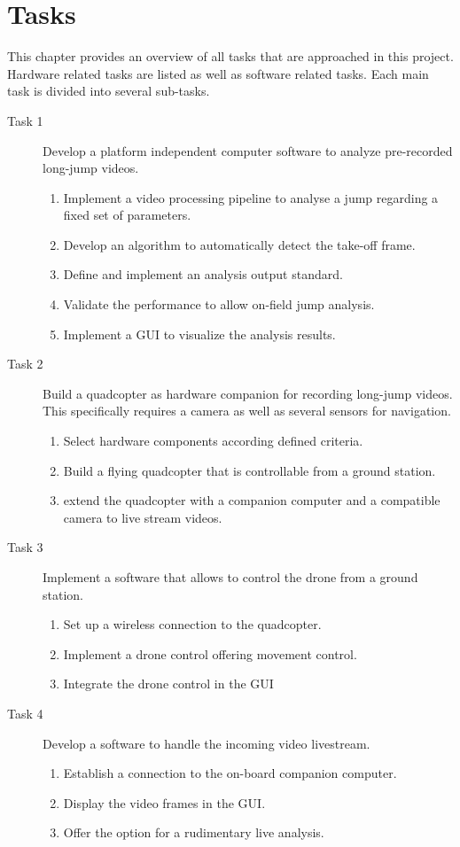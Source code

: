 \graphicspath{{./figures/}}
\chapter{Tasks}\label{chapt:2_tasks}
This chapter provides an overview of all tasks that are approached in this
project.
Hardware related tasks are listed as well as software related tasks.
Each main task is divided into several sub-tasks.

\begin{description}
    \item[Task 1] Develop a platform independent computer software to analyze 
    pre-recorded long-jump videos.
    \begin{enumerate}
        \item Implement a video processing pipeline to analyse a jump regarding 
        a fixed set of parameters.
        \item Develop an algorithm to automatically detect the take-off frame.
        \item Define and implement an analysis output standard.
        \item Validate the performance to allow on-field jump analysis.
        \item Implement a \acs*{GUI} to visualize the analysis results.
    \end{enumerate}
    \item[Task 2] Build a quadcopter as hardware companion for recording 
    long-jump videos. This specifically requires a camera as well as several
    sensors for navigation.
    \begin{enumerate}
        \item Select hardware components according defined criteria.
        \item Build a flying quadcopter that is controllable from a ground
        station.
        \item extend the quadcopter with a companion computer and a compatible
        camera to live stream videos.
    \end{enumerate}
    \item[Task 3] Implement a software that allows to control the drone from a
    ground station.
    \begin{enumerate}
        \item Set up a wireless connection to the quadcopter.
        \item Implement a drone control offering movement control.
        \item Integrate the drone control in the \acs*{GUI}
    \end{enumerate}
    \item[Task 4] Develop a software to handle the incoming video livestream.
    \begin{enumerate}
        \item Establish a connection to the on-board companion computer.
        \item Display the video frames in the \acs*{GUI}.
        \item Offer the option for a rudimentary live analysis.
    \end{enumerate}
\end{description}
